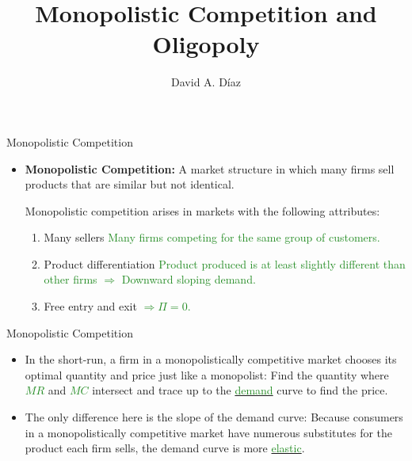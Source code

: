 \documentclass[xcolor={dvipsnames},pdf, hyperref={colorlinks=true, citecolor=ForestGreen, linkcolor=BlueViolet, urlcolor=Magenta}, handout]{beamer}
\title{Monopolistic Competition and Oligopoly}
\author{David A. D\'iaz}
\institute{UNC Chapel Hill}
\date{}
\theoremstyle{definition}
\newcommand{\defn}[1]{\textbf{#1}}
\newcommand{\ddp}[1]{{\textcolor{ForestGreen}{#1}}}
\newcommand{\dd}[1]{{\underline{\textcolor{ForestGreen}{#1}}}}
\begin{document}
 
	
	\begin{frame}
		
		\titlepage
		
	\end{frame}


\begin{frame}{Monopolistic Competition}
\begin{itemize}
	\item 	\defn{Monopolistic Competition:} A market structure in which many firms sell products that are similar but not identical.
	
	Monopolistic competition arises in markets with the following attributes:
	\begin{enumerate}
		\item Many sellers \ddp{Many firms competing for the same group of customers.}
		\item Product differentiation \ddp{Product produced is at least slightly different than other firms $\Rightarrow$ Downward sloping demand.}
		\item Free entry and exit \ddp{$\Rightarrow \Pi = 0$.}
	\end{enumerate}
\end{itemize}
\end{frame}

\begin{frame}{Monopolistic Competition}
\begin{itemize}
	\item 	In the short-run, a firm in a monopolistically competitive market chooses its optimal quantity and price just like a monopolist: Find the quantity where \dd{$MR$} and \dd{$MC$} intersect and trace up to the \dd{demand} curve to find the price. 
	\item The only difference here is the slope of the demand curve: Because consumers in a monopolistically competitive market have numerous substitutes for the product each firm sells, the demand curve is more \dd{elastic}. 
\end{itemize}
\end{frame}
\end{document}
